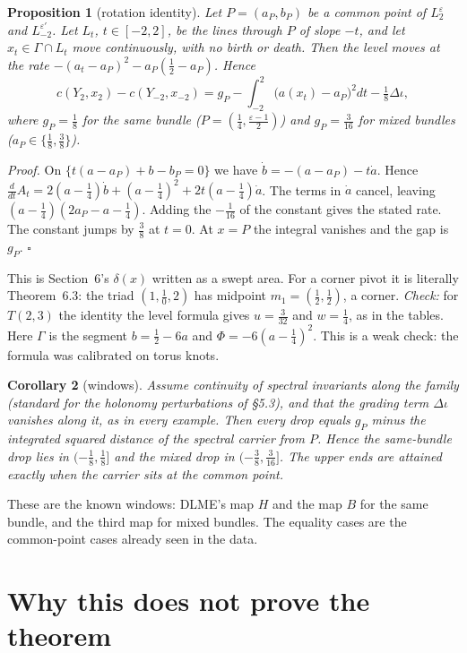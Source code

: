 \documentclass[10pt]{amsart}
\newtheorem{prop}{Proposition}
\newtheorem{cor}[prop]{Corollary}
\begin{document}
\begin{prop}[rotation identity]
Let $P=(a_P,b_P)$ be a common point of $L_2^\varepsilon$ and $L_{-2}^{\varepsilon'}$. Let
$L_t$, $t\in[-2,2]$, be the lines through $P$ of slope $-t$, and let $x_t\in\Gamma\cap L_t$
move continuously, with no birth or death. Then the level moves at the rate
$-(a_t-a_P)^2-a_P(\frac12-a_P)$. Hence
\[
c(Y_2,x_2)-c(Y_{-2},x_{-2})=g_P-\int_{-2}^{2}\bigl(a(x_t)-a_P\bigr)^2dt-\tfrac18\Delta\iota,
\]
where $g_P=\frac18$ for the same bundle ($P=(\frac14,\frac{\varepsilon-1}2)$) and
$g_P=\frac3{16}$ for mixed bundles ($a_P\in\{\frac18,\frac38\}$).
\end{prop}

\noindent\emph{Proof.} On $\{t(a-a_P)+b-b_P=0\}$ we have
$\dot b=-(a-a_P)-t\dot a$. Hence $\frac d{dt}A_t=2(a-\frac14)\dot b+(a-\frac14)^2+2t(a-\frac14)\dot a$.
The terms in $\dot a$ cancel, leaving $(a-\frac14)(2a_P-a-\frac14)$. Adding the
$-\frac1{16}$ of the constant gives the stated rate. The constant jumps by
$\frac38$ at $t=0$. At $x=P$ the integral vanishes and the gap is $g_P$. $\square$

\noindent This is Section~6's $\delta(x)$ written as a swept area. For a corner
pivot it is literally Theorem~6.3: the triad $(1,\frac10,2)$ has midpoint
$m_1=(\frac12,\frac12)$, a corner. \emph{Check:} for $T(2,3)$ the identity
the level formula gives $u=\frac3{32}$ and $w=\frac14$, as in the tables.
Here $\Gamma$ is the segment $b=\frac12-6a$ and $\Phi=-6(a-\frac14)^2$.
This is a weak check: the formula was calibrated on torus knots.

\begin{cor}[windows]
Assume continuity of spectral invariants along the family (standard for the
holonomy perturbations of \S5.3), and that the grading term $\Delta\iota$
vanishes along it, as in every example. Then every drop equals $g_P$ minus the integrated
squared distance of the \emph{spectral carrier} from $P$. Hence the same-bundle
drop lies in $(-\frac18,\frac18]$ and the mixed drop in $(-\frac38,\frac3{16}]$. The
upper ends are attained exactly when the carrier sits at the common point.
\end{cor}

\noindent These are the known windows: DLME's map $H$ and the map $B$ for the same
bundle, and the third map for mixed bundles. The equality cases are the
common-point cases already seen in the data.

\section{Why this does not prove the theorem}
\end{document}
